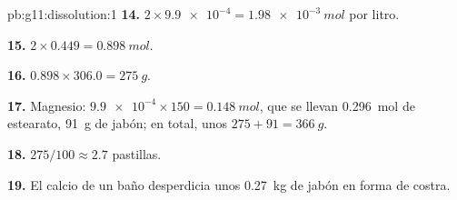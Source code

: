 \begin{solution}{pb:g11:dissolution:1}
\textbf{14.} $2 \times \num{9.9e-4} = \qty{1.98e-3}{mol}$ por litro.

\textbf{15.} $2 \times 0.449 = \qty{0.898}{mol}$.

\textbf{16.} $0.898 \times 306.0 = \qty{275}{g}$.

\textbf{17.} Magnesio: $\num{9.9e-4} \times 150 = \qty{0.148}{mol}$, que
se llevan \qty{0.296}{mol} de estearato, \qty{91}{g} de jabón; en total,
unos $275 + 91 = \qty{366}{g}$.

\textbf{18.} $275 / 100 \approx 2.7$ pastillas.

\textbf{19.} El calcio de un baño desperdicia unos \qty{0.27}{kg} de
jabón en forma de costra.
\end{solution}

